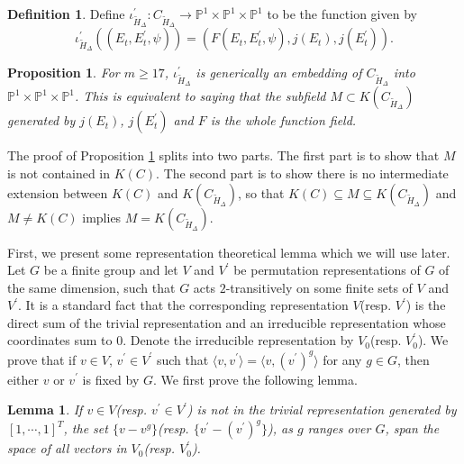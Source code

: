 \documentclass[12pt]{amsart}
\newtheorem{prop}[thm]{Proposition}
\newtheorem{lem}[thm]{Lemma}
\theoremstyle{definition}
\newtheorem{defn}[thm]{Definition}
\theoremstyle{remark}
\numberwithin{equation}{section}
\renewcommand{\P}{\mathbb{P}}
\begin{document}
 \begin{defn}
 	Define $\iota_{\tilde{H}_{\Delta}}^{\prime}: C_{\tilde{H}_{\Delta}} \to \P^{1} \times \P^{1} \times \P^{1}$ to be the function given by 	 $$\iota_{\tilde{H}_{\Delta}}^{\prime}((E_{t},E_{t}^{\prime}, \psi)) = (F(E_{t}, E_{t}^{\prime}, \psi), j(E_{t}), j(E_{t}^{\prime})).$$

 \end{defn}
\begin{prop}\label{genericE}
For $m \ge 17$, $\iota^{\prime}_{\tilde{H}_{\Delta}}$ is generically an embedding of $C_{\tilde{H}_{\Delta}}$ into $\P^{1} \times \P^{1} \times \P^{1}$. This is equivalent to saying that the subfield $M \subset K(C_{\tilde{H}_{\Delta}})$ generated by $j(E_{t})$, $j(E_{t}^{\prime})$ and $F$ is the whole function field.
	
\end{prop}
\vspace{1em}
The proof of Proposition \ref{genericE} splits into two parts. The first part is to show that $M$ is not contained in $K(C)$. The second part is to show there is no intermediate extension between $K(C)$ and $K(C_{\tilde{H}_{\Delta}})$, so that $K(C) \subseteq M \subseteq K(C_{\tilde{H}_{\Delta}})$ and $M \ne K(C)$ implies $M=K(C_{\tilde{H}_{\Delta}}).$

\vspace{1em}

First, we present some representation theoretical lemma which we will use later.
Let $G$ be a finite group and let $V$ and $V^{\prime}$ be permutation representations of $G$ of the same dimension, such that $G$ acts $2$-transitively on some finite sets of $V$ and $V^{\prime}$. It is a standard fact that the corresponding representation $V$(resp. $V^{\prime}$) is the direct sum of the trivial representation and an irreducible representation whose coordinates sum to $0$. Denote the irreducible representation by $V_{0}$(resp. $V^{\prime}_{0}$). We prove that if $v \in V$, $v^{\prime} \in V^{\prime}$ such that $\langle v, v^{\prime} \rangle = \langle v, (v^{\prime})^{g} \rangle$ for any $g \in G$, then either $v$ or $v^{\prime}$ is fixed by $G$. We first prove the following lemma.

\begin{lem}\label{4.6}
If $v \in V$(resp. $v^{\prime} \in V^{\prime}$) is not in the trivial representation generated by $[1, \cdots , 1]^{T}$, the set $\{v-v^{g}\}$(resp. $\{v^{\prime}-(v^{\prime})^{g}\}$), as $g$ ranges over $G$, span the space of all vectors in $V_{0}$(resp. $V^{\prime}_{0}$). 
\end{lem}
\end{document}
